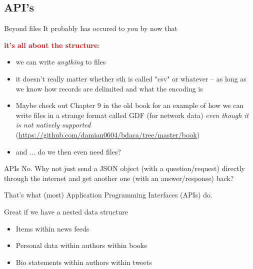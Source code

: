 \documentclass[compress]{beamer}
\begin{document}
\subsection{API's}

\begin{frame}{Beyond files}
It probably has occured to you by now that


\textcolor{red}{\large{\textbf{it's all about the structure}}}:
\begin{itemize}
	\item<2-> we can write \textit{anything} to files
	\item<3-> it doesn't really matter whether sth is called "csv" or whatever -- as long as we know how records are delimited and what the encoding is
	\item<4-> Maybe check out Chapter 9 in the old book for an example of how we can write files in a strange format called GDF (for network data) \emph{even though it is not natively supported} \parencite{Trilling2016} (\url{https://github.com/damian0604/bdaca/tree/master/book})
	\item<5-> and $\ldots$ do we then even need files?
\end{itemize}

\end{frame}

\begin{frame}{APIs}
	{\huge{No.}}
	Why not just send a JSON object (with a question/request) directly through the internet and get another one (with an answer/response) back?
	
	That's what (most) Application Programming Interfaces (APIs) do.
	
	\begin{block}{Great if we have a nested data structure}
		\begin{itemize}
			\item<2-> Items within news feeds
			\item<3-> Personal data within authors within books
			\item<4-> Bio statements within authors within tweets
		\end{itemize}
	\end{block}
\end{frame}
\end{document}
